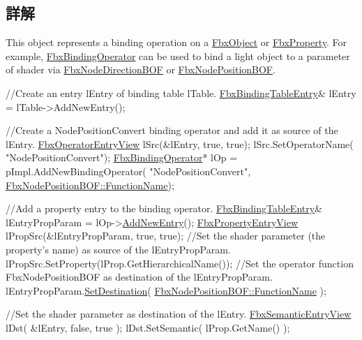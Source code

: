 \subsection{詳解}
This object represents a binding operation on a \hyperlink{class_fbx_object}{Fbx\+Object} or \hyperlink{class_fbx_property}{Fbx\+Property}. For example, \hyperlink{class_fbx_binding_operator}{Fbx\+Binding\+Operator} can be used to bind a light object to a parameter of shader via \hyperlink{class_fbx_node_direction_b_o_f}{Fbx\+Node\+Direction\+B\+OF} or \hyperlink{class_fbx_node_position_b_o_f}{Fbx\+Node\+Position\+B\+OF}. 
\begin{DoxyCode}
\textcolor{comment}{//Create an entry lEntry of binding table lTable.}
\hyperlink{class_fbx_binding_table_entry}{FbxBindingTableEntry}& lEntry = lTable->AddNewEntry();

\textcolor{comment}{//Create a NodePositionConvert binding operator and add it as source of the lEntry.}
\hyperlink{class_fbx_operator_entry_view}{FbxOperatorEntryView} lSrc(&lEntry, \textcolor{keyword}{true}, \textcolor{keyword}{true});
lSrc.SetOperatorName( \textcolor{stringliteral}{"NodePositionConvert"});
\hyperlink{class_fbx_binding_operator}{FbxBindingOperator}* lOp = pImpl.AddNewBindingOperator( \textcolor{stringliteral}{"NodePositionConvert"}, 
      \hyperlink{class_fbx_node_position_b_o_f_aaa0c4610384d1dbb4e566bad44c356ee}{FbxNodePositionBOF::FunctionName});

\textcolor{comment}{//Add a property entry to the binding operator.}
\hyperlink{class_fbx_binding_table_entry}{FbxBindingTableEntry}& lEntryPropParam = lOp->\hyperlink{class_fbx_binding_table_base_a2ebf180e80538abf0e6512a8ca30ee10}{AddNewEntry}();
\hyperlink{class_fbx_property_entry_view}{FbxPropertyEntryView} lPropSrc(&lEntryPropParam, \textcolor{keyword}{true}, \textcolor{keyword}{true});
\textcolor{comment}{//Set the shader parameter (the property's name) as source of the lEntryPropParam.}
lPropSrc.SetProperty(lProp.GetHierarchicalName());
\textcolor{comment}{//Set the operator function FbxNodePositionBOF as destination of the lEntryPropParam.}
lEntryPropParam.\hyperlink{class_fbx_binding_table_entry_aaa49a62bd197febfb6052f3efa50eaf3}{SetDestination}( \hyperlink{class_fbx_node_position_b_o_f_aaa0c4610384d1dbb4e566bad44c356ee}{FbxNodePositionBOF::FunctionName}
       );

\textcolor{comment}{//Set the shader parameter as destination of the lEntry.}
\hyperlink{class_fbx_semantic_entry_view}{FbxSemanticEntryView} lDst( &lEntry, \textcolor{keyword}{false}, \textcolor{keyword}{true} );
lDst.SetSemantic( lProp.GetName() );
\end{DoxyCode}



